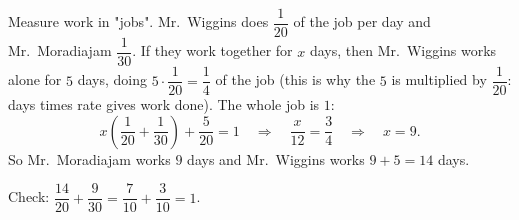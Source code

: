 Measure work in "jobs". Mr.\ Wiggins does $\dfrac{1}{20}$ of the job per day and Mr.\ Moradiajam $\dfrac{1}{30}$. If they work together for $x$ days, then Mr.\ Wiggins works alone for $5$ days, doing $5\cdot\dfrac{1}{20}=\dfrac{1}{4}$ of the job (this is why the $5$ is multiplied by $\dfrac{1}{20}$: days times rate gives work done). The whole job is $1$:
\[
x\left(\dfrac{1}{20}+\dfrac{1}{30}\right)+\dfrac{5}{20}=1\quad\Longrightarrow\quad\dfrac{x}{12}=\dfrac{3}{4}\quad\Longrightarrow\quad x=9 .
\]
So Mr.\ Moradiajam works $\boxed{9}$ days and Mr.\ Wiggins works $9+5=\boxed{14}$ days.

Check: $\dfrac{14}{20}+\dfrac{9}{30}=\dfrac{7}{10}+\dfrac{3}{10}=1$.
